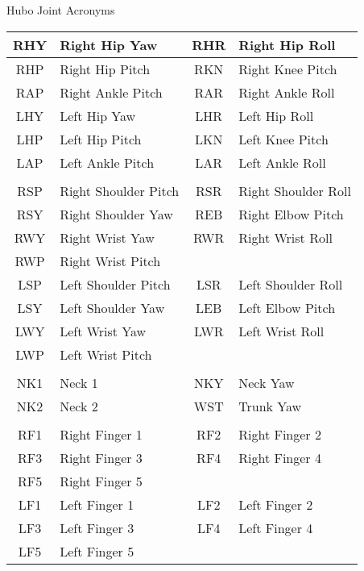\Large
\centering
Hubo Joint Acronyms\\
\normalsize
\begin{longtable}{c | l || c | l}
\hline
		RHY				&	Right Hip Yaw     & RHR				&	Right Hip Roll \\
		\hline
		RHP				&	Right Hip Pitch   & RKN				&	Right Knee Pitch\\
		\hline
		RAP				&	Right Ankle Pitch & RAR				&	Right Ankle Roll\\
\hline

\hline
		LHY				&	Left Hip Yaw      & LHR				&	Left Hip Roll\\
		\hline
		LHP				&	Left Hip Pitch    & LKN				&	Left Knee Pitch\\
		\hline
		LAP				&	Left Ankle Pitch  & LAR				&	Left Ankle Roll\\
\hline
& & & \\
\hline
		RSP				&	Right Shoulder Pitch & RSR			&	Right Shoulder Roll\\
		\hline
		RSY				&	Right Shoulder Yaw   & REB			&	Right Elbow Pitch\\
		\hline
		RWY				&   Right Wrist Yaw      & RWR			&   Right Wrist Roll\\
		\hline
		RWP				&   Right Wrist Pitch    & & \\
\hline

\hline
		LSP				&	Left Shoulder Pitch  & LSR		    &	Left Shoulder Roll\\
		\hline
		LSY				&	Left Shoulder Yaw    & LEB			&	Left Elbow Pitch\\
		\hline
		LWY				&   Left Wrist Yaw       & LWR			&   Left Wrist Roll\\
		\hline
		LWP				&   Left Wrist Pitch	 & & \\
\hline
& & & \\
\hline
		NK1				& Neck 1    & NKY				& Neck Yaw\\
		\hline
	    NK2				& Neck 2    & WST				& Trunk Yaw \\
\hline

		  & & \\
\hline
		RF1				&	Right Finger 1 & RF2				&	Right Finger 2\\
		\hline
		RF3				&	Right Finger 3 & RF4				&	Right Finger 4\\
		\hline
		RF5				&	Right Finger 5 & & \\
\hline

\hline
		LF1				&	Left Finger 1 & LF2				&	Left Finger 2\\
		\hline
		LF3				&	Left Finger 3 & LF4				&	Left Finger 4\\
		\hline
		LF5				&	Left Finger 5 & & \\
		
\end{longtable}
